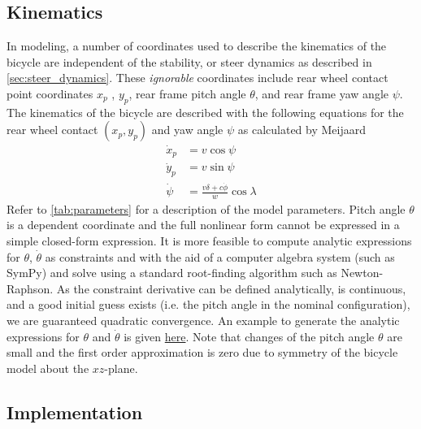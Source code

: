 \documentclass[11pt,a4paper,reqno]{amsart}
\newcommand{\x}{x_{p}}
\newcommand{\y}{y_{p}}
\newcommand{\pitch}{\theta}
\newcommand{\yaw}{\psi}
\newcommand{\steer}{\delta}
\newcommand{\dx}{\dot{x}_{p}}
\newcommand{\dy}{\dot{y}_{p}}
\newcommand{\pitchRate}{\dot{\theta}}
\newcommand{\yawRate}{\dot{\psi}}
\newcommand{\steerRate}{\dot{\phi}}
\begin{document}
\subsection{Kinematics}

In modeling, a number of coordinates used to describe the kinematics of the bicycle are independent of the stability, or
steer dynamics as described in \autoref{sec:steer_dynamics}.
These \textit{ignorable} coordinates include
rear wheel contact point coordinates $ x_p $ , $ y_p $,
rear frame pitch angle $ \pitch $, and rear frame yaw angle $ \yaw $.
The kinematics of the bicycle are described with the following equations for the rear wheel contact $ (\x, \y) $ and
yaw angle $ \yaw $ as calculated by Meijaard\cite{meijaard2007}
\begin{equation}
\begin{aligned}
    \dx &= v \cos{\yaw} \\
    \dy &= v \sin{\yaw} \\
    \yawRate &= \frac{v \steer + c \steerRate}{w} \cos{\lambda} \label{eq:kineq}
\end{aligned}
\end{equation}
Refer to \autoref{tab:parameters} for a description of the model parameters.
Pitch angle $ \pitch $ is a dependent coordinate and the full nonlinear form cannot be expressed in a simple closed-form
expression.
It is more feasible to compute analytic expressions for $ \pitch $, $ \pitchRate $ as constraints and with the aid of a
computer algebra system (such as SymPy\cite{sympy}) and solve using a standard root-finding algorithm such as
Newton-Raphson.
As the constraint derivative can be defined analytically, is continuous, and a good initial guess exists (i.e. the pitch
angle in the nominal configuration), we are guaranteed quadratic convergence.
An example to generate the analytic expressions for $ \pitch$ and $ \pitchRate $ is given
\href{https://github.com/oliverlee/bicycle/blob/master/python/pitch_constraint.py}{here}.
Note that changes of the pitch angle $ \pitch $ are small and the first order approximation is zero due to symmetry of
the bicycle model about the $ xz $-plane.

\subsection{Implementation}
\end{document}
